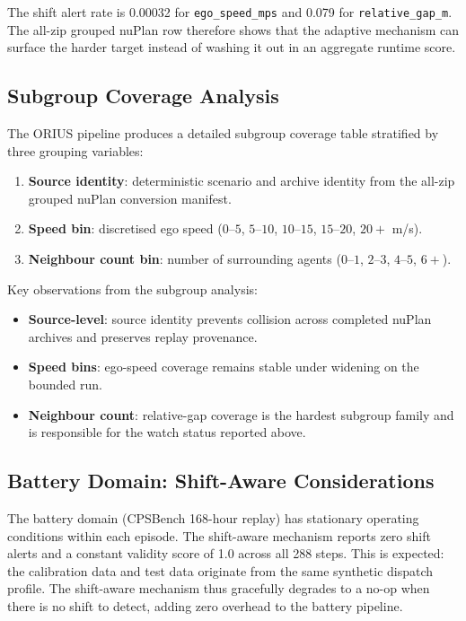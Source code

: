 The shift alert rate is 0.00032 for \texttt{ego\_speed\_mps} and 0.079 for
\texttt{relative\_gap\_m}.  The all-zip grouped nuPlan row therefore shows that the adaptive
mechanism can surface the harder target instead of washing it out in an aggregate
runtime score.

\subsection{Subgroup Coverage Analysis}

The ORIUS pipeline produces a detailed subgroup coverage table stratified by three
grouping variables:

\begin{enumerate}[nosep]
  \item \textbf{Source identity}: deterministic scenario and archive identity from
        the all-zip grouped nuPlan conversion manifest.
  \item \textbf{Speed bin}: discretised ego speed ($0$--$5$, $5$--$10$, $10$--$15$,
        $15$--$20$, $20+$ m/s).
  \item \textbf{Neighbour count bin}: number of surrounding agents ($0$--$1$,
        $2$--$3$, $4$--$5$, $6+$).
\end{enumerate}

Key observations from the subgroup analysis:
\begin{itemize}[nosep]
  \item \textbf{Source-level}: source identity prevents collision across completed
        nuPlan archives and preserves replay provenance.
  \item \textbf{Speed bins}: ego-speed coverage remains stable under widening on the
        bounded run.
  \item \textbf{Neighbour count}: relative-gap coverage is the hardest subgroup
        family and is responsible for the watch status reported above.
\end{itemize}

\subsection{Battery Domain: Shift-Aware Considerations}

The battery domain (CPSBench 168-hour replay) has stationary operating conditions
within each episode.  The shift-aware mechanism reports zero shift alerts and a
constant validity score of 1.0 across all 288 steps.  This is expected: the
calibration data and test data originate from the same synthetic dispatch profile.
The shift-aware mechanism thus gracefully degrades to a no-op when there is no
shift to detect, adding zero overhead to the battery pipeline.

